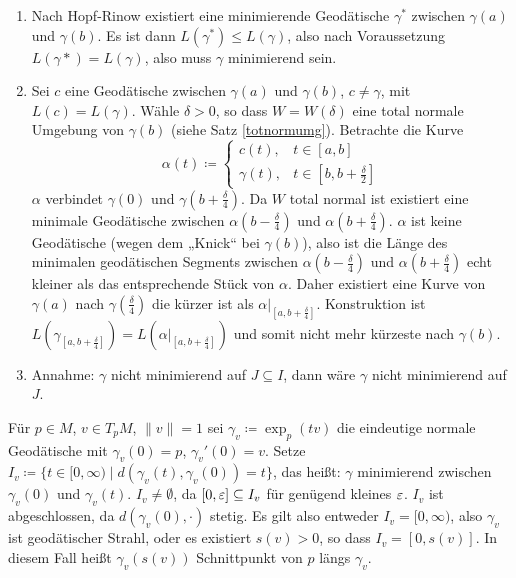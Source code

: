 \documentclass[a4paper,twoside,DIV15,BCOR12mm]{scrbook}
\renewcommand{\da}{\coloneqq}
\begin{document}
\begin{beweis}
\begin{enumerate}
\item 
Nach Hopf-Rinow existiert eine minimierende Geodätische $\gamma^*$ zwischen $\gamma(a)$ und $\gamma(b)$. Es ist dann $L(\gamma^*)\le L(\gamma)$, also nach Voraussetzung $L(\gamma*)=L(\gamma)$, also muss $\gamma$ minimierend sein.
\item Sei $c$ eine Geodätische zwischen $\gamma(a)$ und $\gamma(b)$, $c\ne \gamma$, mit $L(c) = L(\gamma)$. Wähle $\delta>0$, so dass $W=W(\delta)$ eine total normale Umgebung von $\gamma(b)$ (siehe Satz \ref{totnormumg}). Betrachte die Kurve
\[
\alpha(t) \da 
\begin{cases}
c(t), & t\in [a,b] \\
\gamma(t), & t\in [b,b+\frac\delta2]
\end{cases}
\]
$\alpha$ verbindet $\gamma(0)$ und $\gamma(b+\frac\delta4)$. Da $W$ total normal ist existiert eine minimale Geodätische zwischen $\alpha(b-\frac\delta4)$ und $\alpha(b+\frac\delta4)$. $\alpha$ ist keine Geodätische (wegen dem „Knick“ bei $\gamma(b)$), also ist die Länge des minimalen geodätischen Segments zwischen $\alpha(b-\frac\delta4)$ und $\alpha(b+\frac\delta4)$ echt kleiner als das entsprechende Stück von $\alpha$. Daher existiert eine Kurve von $\gamma(a)$ nach $\gamma(\frac\delta4)$ die kürzer ist als $\alpha|_{[a,b+\frac\delta4]}$. Konstruktion ist $L(\gamma_{[a,b+\frac\delta4]}) = L(\alpha|_{[a,b+\frac\delta4]})$ und somit nicht mehr kürzeste nach $\gamma(b)$.
\item Annahme: $\gamma$ nicht minimierend auf $J\subseteq I$, dann wäre $\gamma$ nicht minimierend auf $J$.
\end{enumerate}
\end{beweis}

Für $p\in M$, $v\in T_pM$, $\|v\|=1$ sei $\gamma_v \da \exp_p(tv)$ die eindeutige normale Geodätische mit $\gamma_v(0)=p$, $\gamma_v'(0)=v$. Setze $I_v \da \{ t\in [0,\infty) \mid d(\gamma_v(t), \gamma_v(0))=t\}$, das heißt: $\gamma$ minimierend zwischen $\gamma_v(0)$ und $\gamma_v(t)$. $I_v \ne \emptyset$, da $[0,\varepsilon]\subseteq I_v$ für genügend kleines $\varepsilon$. $I_v$ ist abgeschlossen, da $d(\gamma_v(0),\cdot)$ stetig. Es gilt also entweder $I_v = [0,\infty)$, also $\gamma_v$ ist geodätischer Strahl, oder es existiert $s(v)>0$, so dass $I_v=[0,s(v)]$. In diesem Fall heißt $\gamma_v(s(v))$ Schnittpunkt von $p$ längs $\gamma_v$.
\end{document}
